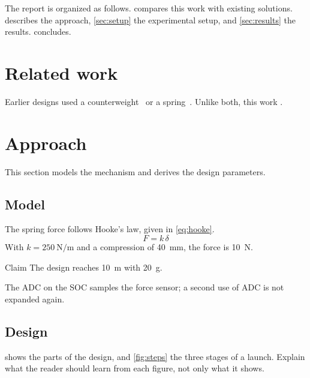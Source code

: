 \documentclass[a4paper, 11pt]{article}
\begin{document}
The report is organized as follows.
 compares this work with existing solutions.
 describes the approach, \cref{sec:setup} the experimental setup, and \cref{sec:results} the results.
 concludes.

\section{Related work}
\label{sec:related}
Earlier designs used a counterweight~\cite{knuth1986} or a spring~\cite{bbc_springs}.
Unlike both, this work .

\section{Approach}
\label{sec:approach}
This section models the mechanism and derives the design parameters.

\subsection{Model}
\label{sec:model}
The spring force follows Hooke's law, given in \cref{eq:hooke}.
\begin{equation}
  F = k \, \delta
  \label{eq:hooke}
\end{equation}
With $k = \SI{250}{\newton\per\metre}$ and a compression of \SI{40}{\milli\metre}, the force is \SI{10}{\newton}.
\begin{block}{Claim}
  The design reaches \SI{10}{\metre} with \SI{20}{\gram}.
\end{block}
The \ac{ADC} on the \ac{SOC} samples the force sensor; a second use of \ac{ADC} is not expanded again.

\subsection{Design}
\label{sec:design}
 shows the parts of the design, and \cref{fig:steps} the three stages of a launch.
Explain what the reader should learn from each figure, not only what it shows.
\end{document}
